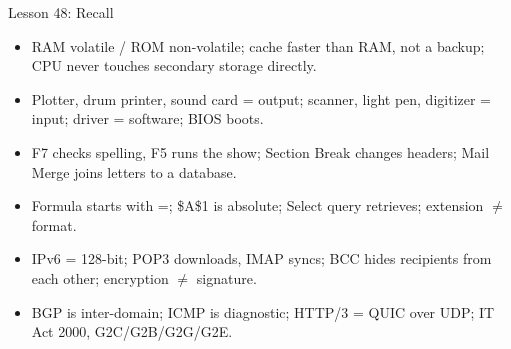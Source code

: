 \documentclass[aspectratio=169]{beamer}
\begin{document}
\begin{frame}{Lesson 48: Recall}
  \begin{itemize}
    \item RAM volatile / ROM non-volatile; cache faster than RAM, not a
      backup; CPU never touches secondary storage directly.
    \item Plotter, drum printer, sound card = output; scanner, light pen,
      digitizer = input; driver = software; BIOS boots.
    \item F7 checks spelling, F5 runs the show; Section Break changes headers;
      Mail Merge joins letters to a database.
    \item Formula starts with =; \$A\$1 is absolute; Select query retrieves;
      extension $\ne$ format.
    \item IPv6 = 128-bit; POP3 downloads, IMAP syncs; BCC hides recipients
      from each other; encryption $\ne$ signature.
    \item BGP is inter-domain; ICMP is diagnostic; HTTP/3 = QUIC over UDP;
      IT Act 2000, G2C/G2B/G2G/G2E.
  \end{itemize}
\end{frame}
\end{document}
